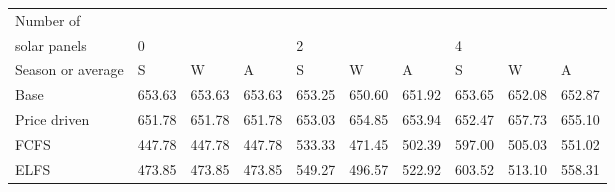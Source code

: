 \begin{table}[h] 
\centering 
\begin{tabular}{l|lll|lll|lll}Number of \\ solar panels&0& & &2& & &4& & \\ \hline 
Season or average & S & W & A & S & W & A & S & W & A \\ \hline 
Base&653.63&653.63&653.63&653.25&650.60&651.92&653.65&652.08&652.87 \\ 
Price driven&651.78&651.78&651.78&653.03&654.85&653.94&652.47&657.73&655.10 \\ 
FCFS&447.78&447.78&447.78&533.33&471.45&502.39&597.00&505.03&551.02 \\ 
ELFS&473.85&473.85&473.85&549.27&496.57&522.92&603.52&513.10&558.31 \\ 
\end{tabular} 
\end{table}